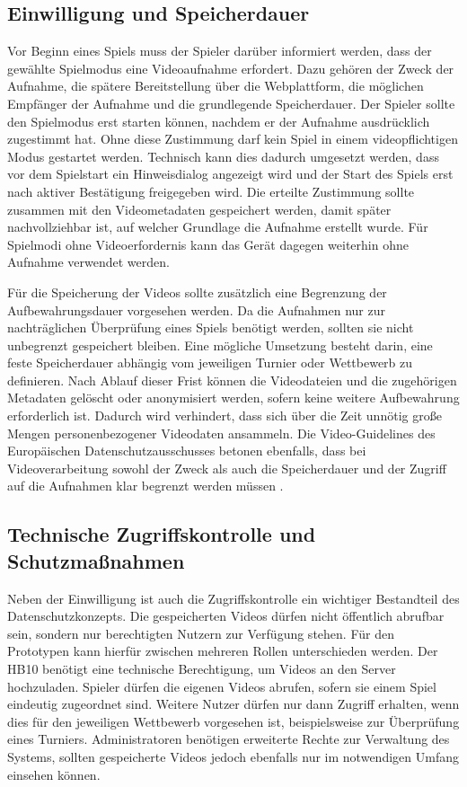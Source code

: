 \subsection{Einwilligung und Speicherdauer}

Vor Beginn eines Spiels muss der Spieler darüber informiert werden, dass der gewählte Spielmodus eine Videoaufnahme erfordert. Dazu gehören der Zweck der Aufnahme, die spätere Bereitstellung über die Webplattform, die möglichen Empfänger der Aufnahme und die grundlegende Speicherdauer. 
Der Spieler sollte den Spielmodus erst starten können, nachdem er der Aufnahme ausdrücklich zugestimmt hat. Ohne diese Zustimmung darf kein Spiel in einem videopflichtigen Modus gestartet werden. Technisch kann dies dadurch umgesetzt werden, 
dass vor dem Spielstart ein Hinweisdialog angezeigt wird und der Start des Spiels erst nach aktiver Bestätigung freigegeben wird. Die erteilte Zustimmung sollte zusammen mit den Videometadaten gespeichert werden, damit später nachvollziehbar ist, auf welcher Grundlage die Aufnahme erstellt wurde. 
Für Spielmodi ohne Videoerfordernis kann das Gerät dagegen weiterhin ohne Aufnahme verwendet werden. 

Für die Speicherung der Videos sollte zusätzlich eine Begrenzung der Aufbewahrungsdauer vorgesehen werden. Da die Aufnahmen nur zur nachträglichen Überprüfung eines Spiels benötigt werden, sollten sie nicht unbegrenzt gespeichert bleiben. Eine mögliche Umsetzung besteht darin, 
eine feste Speicherdauer abhängig vom jeweiligen Turnier oder Wettbewerb zu definieren. Nach Ablauf dieser Frist können die Videodateien und die zugehörigen Metadaten gelöscht oder anonymisiert werden, sofern keine weitere Aufbewahrung erforderlich ist. Dadurch wird verhindert, 
dass sich über die Zeit unnötig große Mengen personenbezogener Videodaten ansammeln. Die Video-Guidelines des Europäischen Datenschutzausschusses betonen ebenfalls, 
dass bei Videoverarbeitung sowohl der Zweck als auch die Speicherdauer und der Zugriff auf die Aufnahmen klar begrenzt werden müssen \cite{edpb2019video}. 

\subsection{Technische Zugriffskontrolle und Schutzmaßnahmen}

Neben der Einwilligung ist auch die Zugriffskontrolle ein wichtiger Bestandteil des Datenschutzkonzepts. Die gespeicherten Videos dürfen nicht öffentlich abrufbar sein, sondern nur berechtigten Nutzern zur Verfügung stehen. Für den Prototypen kann hierfür zwischen mehreren Rollen unterschieden werden. 
Der HB10 benötigt eine technische Berechtigung, um Videos an den Server hochzuladen. Spieler dürfen die eigenen Videos abrufen, sofern sie einem Spiel eindeutig zugeordnet sind. Weitere Nutzer dürfen nur dann Zugriff erhalten, wenn dies für den jeweiligen Wettbewerb vorgesehen ist, 
beispielsweise zur Überprüfung eines Turniers. Administratoren benötigen erweiterte Rechte zur Verwaltung des Systems, sollten gespeicherte Videos jedoch ebenfalls nur im notwendigen Umfang einsehen können. 

